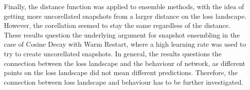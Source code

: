 Finally, the distance function was applied to ensemble methods, with the idea of
getting more uncorellated snapshots from a larger distance on the loss
landscape. However, the corellation seemed to stay the same regardless of the
distance. These results question the underlying argument for snapshot ensembling
in the case of Cosine Decay with Warm Restart, where a high learning rate was
used to try to create uncorellated snapshots. In general, the results questions
the connection between the loss landscape and the behaviour of network, as
different points on the loss landscape did not mean different predictions.
Therefore, the connection between loss landscape and behaviour has to be further
investigated. 
